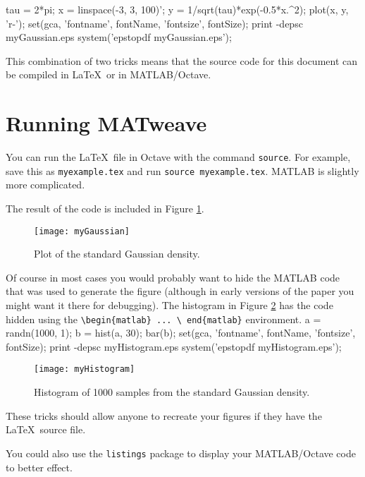 \documentclass{article}
\newenvironment{matlab}{\comment}{\endcomment}
\newenvironment{matlabv}{\verbatim}{\endverbatim}
\begin{document}
\begin{matlabv}
tau = 2*pi;
x = linspace(-3, 3, 100)';
y = 1/sqrt(tau)*exp(-0.5*x.^2);
plot(x, y, 'r-');
set(gca, 'fontname', fontName, 'fontsize', fontSize);
print -depsc myGaussian.eps
system('epstopdf myGaussian.eps');
\end{matlabv}

This combination of two tricks means that the source code for this
document can be compiled in \LaTeX\ or in MATLAB/Octave.

\section{Running MATweave}

You can run the \LaTeX\ file in Octave with the command
\texttt{source}. For example, save this as \texttt{myexample.tex} and
run \texttt{source myexample.tex}. MATLAB is slightly more complicated.

The result of the code is included in Figure \ref{fig:one}.
\begin{figure}
\centerline{\texttt{[image: myGaussian]}}
\caption{Plot of the standard Gaussian density.}\label{fig:one}
\end{figure}

Of course in most cases you would probably want to hide the MATLAB
code that was used to generate the figure (although in early versions
of the paper you might want it there for debugging). The histogram in
Figure \ref{fig:two} has the code hidden using the
\texttt{\textbackslash begin\{matlab\} ... \textbackslash
  end\{matlab\}} environment.
\begin{matlab}
a = randn(1000, 1);
b = hist(a, 30);
bar(b);
set(gca, 'fontname', fontName, 'fontsize', fontSize);
print -depsc myHistogram.eps
system('epstopdf myHistogram.eps');
\end{matlab}
\begin{figure}
\centerline{\texttt{[image: myHistogram]}}
\caption{Histogram of 1000 samples from the standard Gaussian
  density.}\label{fig:two}
\end{figure}

These tricks should allow anyone to recreate your figures if they have
the \LaTeX\ source file.

You could also use the \texttt{listings} package to display your
MATLAB/Octave code to better effect.
\end{document}
